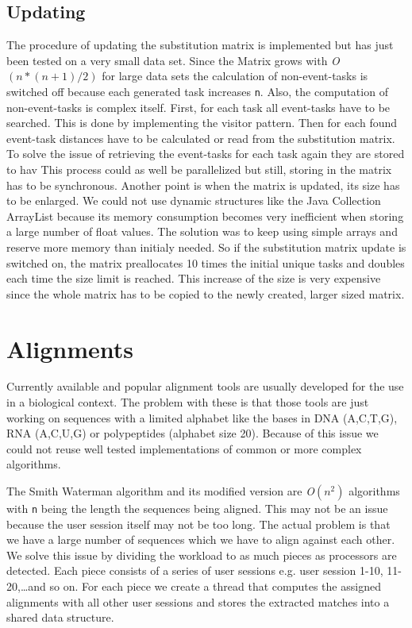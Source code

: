 \subsection{Updating}
	The procedure of updating the substitution matrix is implemented but has just been tested on a very small data set.
	Since the Matrix grows with \textit{O}$(n*(n+1)/2)$ for large data sets the calculation of non-event-tasks is switched off because each generated task increases \texttt{n}.
	Also, the computation of non-event-tasks is complex itself.
	First, for each task all event-tasks have to be searched. This is done by implementing the visitor pattern.
	Then for each found event-task distances have to be calculated or read from the substitution matrix.
	To solve the issue of retrieving the event-tasks for each task again they are stored to hav
	This process could as well be parallelized but still, storing in the matrix has to be synchronous.
	Another point is when the matrix is updated, its size has to be enlarged.
	We could not use dynamic structures like the Java Collection ArrayList because its memory consumption becomes very inefficient when storing a large number of
	float values. The solution was to keep using simple arrays and reserve more memory than initialy needed.
	So if the substitution matrix update is switched on, the matrix preallocates 10 times the initial unique tasks and doubles each time the size limit is reached.
	This increase of the size is very expensive since the whole matrix has to be copied to the newly created, larger sized matrix.

\section{Alignments}
Currently available and popular alignment tools are usually developed for the use in a biological context.
The problem with these is that those tools are just working on sequences with a limited alphabet like the bases in DNA (A,C,T,G), RNA (A,C,U,G) or polypeptides (alphabet size 20).
Because of this issue we could not reuse well tested implementations of common or more complex algorithms.

The Smith Waterman algorithm and its modified version are \textit{O}$(n^2)$ algorithms with \texttt{n} being the length the sequences being aligned.
This may not be an issue because the user session itself may not be too long.
The actual problem is that we have a large number of sequences which we have to align against each other.
We solve this issue by dividing the workload to as much pieces as processors are detected. Each piece consists of a series of user sessions e.g. user session 1-10, 11-20,\ldots and so on.
For each piece we create a thread that computes the assigned alignments with all other user sessions and stores the extracted matches into a shared data structure.


